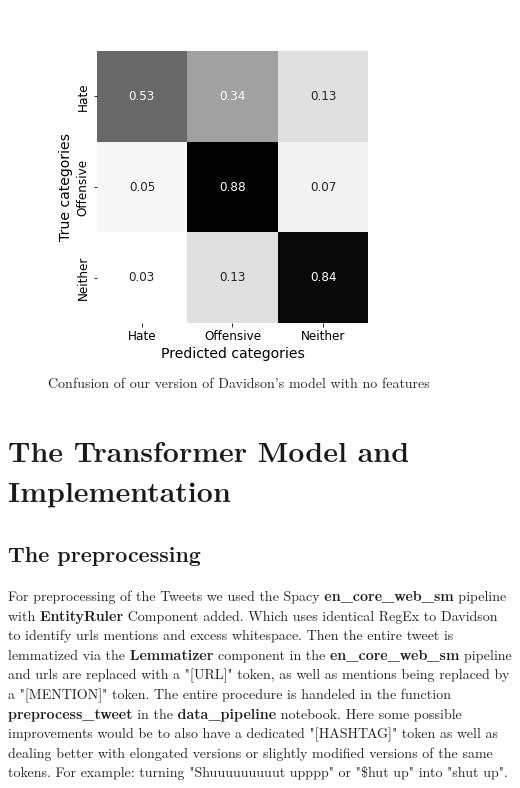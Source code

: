 \documentclass[11pt,a4paper]{article}
\begin{document}
\begin{figure}[h]
  \includegraphics[width=\linewidth]{./tables-figures/nofeat_confusion.jpg}
  \caption{Confusion of our version of Davidson's model with no features}
  \label{fig:nofeature_confusion}
\end{figure}


\section{The Transformer Model and Implementation}

\subsection{The preprocessing}
For preprocessing of the Tweets we used the Spacy \textbf{en\_core\_web\_sm} pipeline with \textbf{EntityRuler} Component added.
Which uses identical RegEx to Davidson to identify urls mentions and excess whitespace.
Then the entire tweet is lemmatized via the \textbf{Lemmatizer} component in the \textbf{en\_core\_web\_sm} pipeline and urls 
are replaced with a "[URL]" token, as well as mentions being replaced by a "[MENTION]" token.
The entire procedure is handeled in the function \textbf{preprocess\_tweet} in the \textbf{data\_pipeline} notebook.
Here some possible improvements would be to also have a dedicated "[HASHTAG]" token as well as dealing better with elongated
versions or slightly modified versions of the same tokens. 
For example: turning "Shuuuuuuuuut upppp" or "\$hut up" into "shut up".
\end{document}
